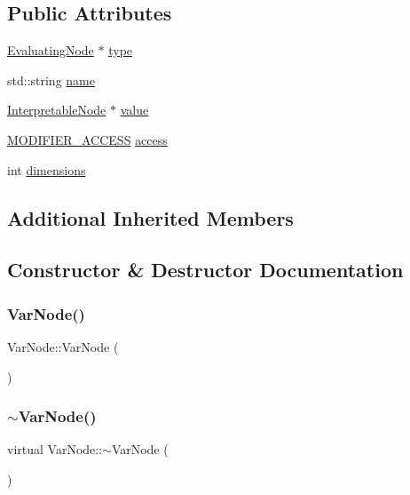\subsection*{Public Attributes}
\begin{DoxyCompactItemize}
\item 
\hyperlink{classEvaluatingNode}{Evaluating\+Node} $\ast$ \hyperlink{classVarNode_a8aff9f630482d9f8570dd9feb10849cd}{type}
\item 
std\+::string \hyperlink{classVarNode_adcfff85229e23fb0670fa3fc14b830e0}{name}
\item 
\hyperlink{classInterpretableNode}{Interpretable\+Node} $\ast$ \hyperlink{classVarNode_a58798cdece4226f1e0b844c8cbcd5146}{value}
\item 
\hyperlink{statics_8h_a0cbe4939ec6da73b52afbebd794d60ba}{M\+O\+D\+I\+F\+I\+E\+R\+\_\+\+A\+C\+C\+E\+SS} \hyperlink{classVarNode_a9d3115ee1b8fde5fe1b9484b57dba54a}{access}
\item 
int \hyperlink{classVarNode_a408a93fc558984318fb6fdad5cb36077}{dimensions}
\end{DoxyCompactItemize}
\subsection*{Additional Inherited Members}


\subsection{Constructor \& Destructor Documentation}
\mbox{\label{classVarNode_a86b94143b89fc73a69cafb025415689f}} 
\subsubsection{\texorpdfstring{Var\+Node()}{VarNode()}}
{\footnotesize\ttfamily Var\+Node\+::\+Var\+Node (\begin{DoxyParamCaption}{ }\end{DoxyParamCaption})}

\mbox{\label{classVarNode_aab6e763704273c00cd756edbdd0b13df}} 
\subsubsection{\texorpdfstring{$\sim$\+Var\+Node()}{~VarNode()}}
{\footnotesize\ttfamily virtual Var\+Node\+::$\sim$\+Var\+Node (\begin{DoxyParamCaption}{ }\end{DoxyParamCaption})\hspace{0.3cm}{\ttfamily [virtual]}}



